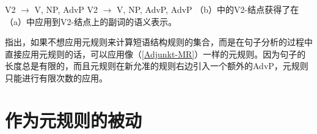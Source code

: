 \eal
\ex V2 $\to$ V, NP, AdvP
\ex V2 $\to$ V, NP, AdvP, AdvP
\zl
（b）中的V2-结点获得了在（a）中应用到V2-结点上的副词的语义表示。

 \citet{WP92b}指出，如果不想应用元规则来计算短语结构规则的集合，而是在句子分析的过程中直接应用元规则的话，可以应用像（\ref{Adjunkt-MR}）一样的元规则。因为句子的长度总是有限的，而且元规则在新允准的规则右边引入一个额外的AdvP，元规则只能进行有限次数的应用。

\section{作为元规则的被动}
\label{sec-passive-gpsg}

